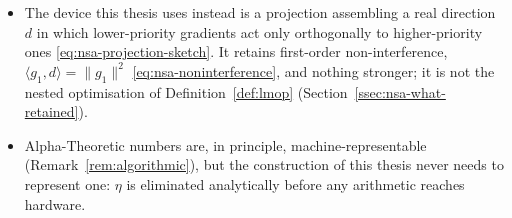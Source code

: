 \begin{itemize}
        $\nabla_\theta f = \sum_i \eta^{\,i-1} g_i$ with each $g_i$ an ordinary real
        gradient \eqref{eq:ns-gradient}. It cannot be descended directly: a step
        leaves $\mathbb{R}^{P}$ and voids the standard-domain hypothesis of
        Theorem~\ref{thm:lmop-scalar} \eqref{eq:ns-step}, while its standard part
        collapses to $g_1$ and deletes every level below the first
        \eqref{eq:st-collapse}.
  \item The device this thesis uses instead is a projection assembling a real
        direction $d$ in which lower-priority gradients act only orthogonally to
        higher-priority ones \eqref{eq:nsa-projection-sketch}. It retains
        first-order non-interference, $\langle g_1,d\rangle = \lVert g_1\rVert^{2}$
        \eqref{eq:nsa-noninterference}, and nothing stronger; it is not the nested
        optimisation of Definition~\ref{def:lmop}
        (Section~\ref{ssec:nsa-what-retained}).
  \item Alpha-Theoretic numbers are, in principle, machine-representable
        (Remark~\ref{rem:algorithmic}), but the construction of this thesis never
        needs to represent one: $\eta$ is eliminated analytically before any
        arithmetic reaches hardware.
\end{itemize}

